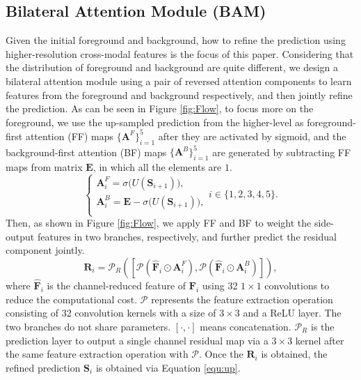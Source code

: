 \documentclass[journal]{IEEEtran}
\newcommand{\figref}[1]{Figure \ref{#1}}
\newcommand{\equref}[1]{Equation \ref{#1}}
\begin{document}
\subsection{Bilateral Attention Module (BAM)}\label{sec:BAM}
\vspace{-3pt}
Given the initial foreground and background,
how to refine the prediction using higher-resolution cross-modal features is the focus of this paper.
Considering that the distribution of foreground and background are quite different,
we design a bilateral attention module using a pair of reversed attention components to
learn features from the foreground and background respectively, and then jointly refine the prediction.
As can be seen in \figref{fig:Flow}, 
to focus more on the foreground,
we use the up-sampled prediction from the higher-level as foreground-first attention (FF) maps $\{\mathbf{A}^F\}_{i=1}^5$ after they are activated by sigmoid,
and the background-first attention (BF) maps $\{\mathbf{A}^B\}_{i=1}^5$ are generated by subtracting FF maps from matrix $\mathbf{E}$, in which all the elements are $1$.
\begin{equation}
\left\{
\begin{array}{l}
\mathbf{A}^F_i=\sigma \Big(U(\mathbf{S}_{i+1})\Big), \\
\mathbf{A}^B_i=\mathbf{E} - \sigma \Big(U(\mathbf{S}_{i+1})\Big), \\
\end{array}
\right.
i\in\{1,2,3,4,5\}.
\end{equation}
Then, as shown in \figref{fig:Flow}, we apply FF and BF to weight the side-output features in two branches, respectively, and further predict the residual component jointly.
\begin{equation}
\mathbf{R}_i = \mathcal{P}_R\left(\left[\mathcal{P}\left( \hat{\mathbf{F}}_i\odot \mathbf{A}^F_i\right),\mathcal{P}\left(\hat{\mathbf{F}}_i\odot \mathbf{A}^B_i\right)\right]\right),
\end{equation}
where $\hat{\mathbf{F}}_i$ is the channel-reduced feature of ${\mathbf{F}}_i$ using 32 $1\times1$ convolutions to reduce the computational cost.
$\mathcal{P}$ represents the feature extraction operation consisting of 32 convolution kernels with a size of $3\times3$ and a ReLU layer.
The two branches do not share parameters.
$[\cdot,\cdot]$ means concatenation.
$\mathcal{P}_R$ is the prediction layer to output a single channel residual map via a $3\times3$ kernel after the same feature extraction operation with $\mathcal{P}$.
Once the $\mathbf{R}_i$ is obtained, the refined prediction $\mathbf{S}_i$ is obtained via \equref{equ:up}.
\end{document}
